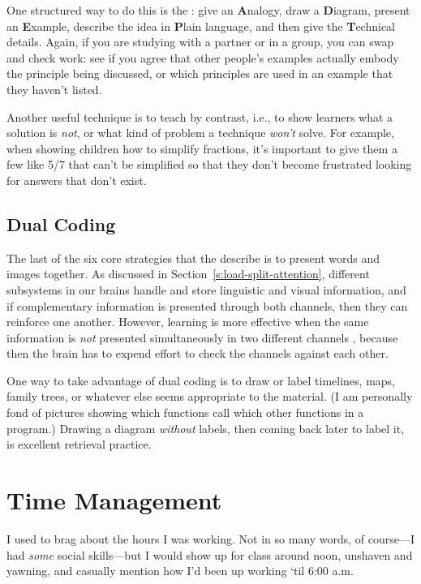 One structured way to do this is the : give an
\textbf{A}nalogy, draw a \textbf{D}iagram, present an \textbf{E}xample, describe the
idea in \textbf{P}lain language, and then give the \textbf{T}echnical details.
Again, if you are studying with a partner or in a group, you can swap
and check work: see if you agree that other people's examples actually
embody the principle being discussed, or which principles are used in
an example that they haven't listed.

Another useful technique is to teach by contrast, i.e., to show learners
what a solution is \emph{not}, or what kind of problem a technique \emph{won't}
solve. For example, when showing children how to simplify fractions,
it's important to give them a few like 5/7 that can't be simplified so
that they don't become frustrated looking for answers that don't exist.

\subsection{Dual Coding}\label{dual-coding}

The last of the six core strategies that the  describe is to present words and
images together. As discussed in Section~\ref{s:load-split-attention},
different subsystems in our brains handle and store linguistic and
visual information, and if complementary information is presented
through both channels, then they can reinforce one another. However,
learning is more effective when the same information is \emph{not}
presented simultaneously in two different channels
\cite{Maye2003}, because then the brain has to expend effort to
check the channels against each other.

One way to take advantage of dual coding is to draw or label timelines,
maps, family trees, or whatever else seems appropriate to the material.
(I am personally fond of pictures showing which functions call which
other functions in a program.) Drawing a diagram \emph{without} labels, then
coming back later to label it, is excellent retrieval practice.

\section{Time Management}\label{s:individual-time}

I used to brag about the hours I was working. Not in so many words, of
course---I had \emph{some} social skills---but I would show up for class around
noon, unshaven and yawning, and casually mention how I'd been up working
`til 6:00 a.m.

